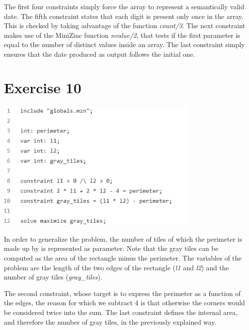 \documentclass{article}
\begin{document}
The first four constraints simply force the array to represent a semantically valid date.
The fifth constraint states that each digit is present only once in the array. This is checked
by taking advantage of the function \textit{count/3}. The next constraint makes use of the MiniZinc
function \textit{nvalue/2}, that tests if the first parameter is equal to the number of distinct values inside an array.
The last constraint simply ensures that the date produced as output follows the initial one.

\section{Exercise 10}
\vspace{0.2cm}
\includegraphics[width=10cm]{img/Es10.png}
\vspace{0.2cm}

In order to generalize the problem, the number of tiles of which the perimeter is made up by is represented
as parameter. Note that the gray tiles can be computed as the area of the rectangle minus the perimeter.
The variables of the problem are the length of the two edges of the rectangle (\textit{l1} and \textit{l2})
and the number of gray tiles (\textit{gray\_tiles}).

The second constraint, whose target is to express the perimeter as a function of the edges, the reason for which we subtract 4
is that otherwise the corners would be considered twice into the sum. 
The last constraint defines the internal area, and therefore the number of gray tiles, in the previously explained
way.
\end{document}
